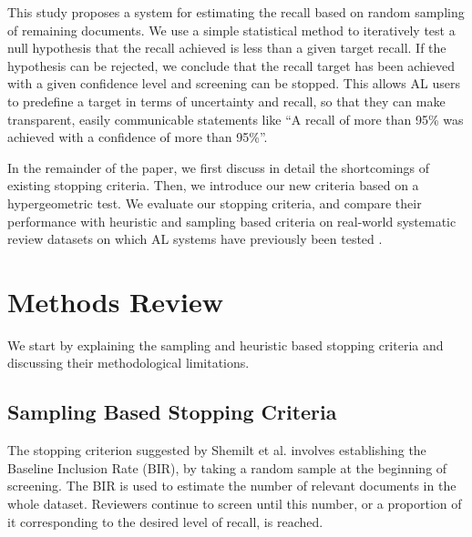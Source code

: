 \documentclass{bmcart}
\begin{document}
	This study proposes a system for estimating the recall based on random sampling of remaining documents. 
	We use a simple statistical method to iteratively test a null hypothesis that the recall achieved is less than a given target recall. If the hypothesis can be rejected, we conclude that the recall target has been achieved with a given confidence level and screening can be stopped.
	This allows AL users to predefine a target in terms of uncertainty and recall, so that they can make transparent, easily communicable statements like ``A recall of more than 95\% was achieved with a confidence of more than 95\%''.
	
	
	
	In the remainder of the paper, we first discuss in detail the shortcomings of existing stopping criteria. Then, we introduce our new criteria based on a hypergeometric test. We evaluate our stopping criteria, and compare their performance with heuristic and sampling based criteria on real-world systematic review datasets on which AL systems have previously been tested \cite{Cohen2006, Yu2019, Terasawa2009, Castaldi2009}.
	
	\section*{Methods Review}
	
	
	We start by explaining the sampling and heuristic based stopping criteria and discussing their methodological limitations. 
	
	\subsection*{Sampling Based Stopping Criteria}
	
	The stopping criterion suggested by Shemilt et al. \cite{Shemilt2014} involves establishing the Baseline Inclusion Rate (BIR), by taking a random sample at the beginning of screening. 
	The BIR is used to estimate the number of relevant documents in the whole dataset. 
	Reviewers continue to screen until this number, or a proportion of it corresponding to the desired level of recall, is reached.
	
\end{document}
